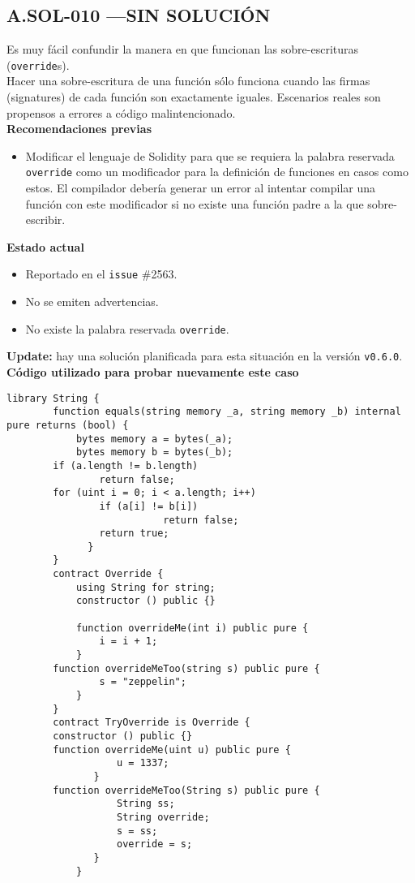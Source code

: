 \subsection*{A.SOL-010  \color{BrickRed}—SIN SOLUCIÓN}
Es muy fácil confundir la manera en que funcionan las sobre-escrituras (\texttt{override}s).\\

Hacer una sobre-escritura de una función sólo funciona cuando las firmas (signatures) de cada función son exactamente iguales. Escenarios reales son propensos a errores a código malintencionado.\\


\textbf{Recomendaciones previas}
\begin{itemize}
    \item Modificar el lenguaje de Solidity para que se requiera la palabra reservada \texttt{override} como un modificador para la definición de funciones en casos como estos. El compilador debería generar un error al intentar compilar una función con este modificador si no existe una función padre a la que sobre-escribir.
\end{itemize}
\bigskip

\textbf{Estado actual}
\begin{itemize}
    \item Reportado en el \texttt{issue} \#2563\cite{GHI2563}.
    \item No se emiten advertencias.
    \item No existe la palabra reservada \texttt{override}.
\end{itemize}

\textbf{Update:} hay una solución planificada para esta situación en la versión \texttt{v0.6.0}.\\

\textbf{Código utilizado para probar nuevamente este caso}
\begin{lstlisting}[language=Solidity]
    library String {
        function equals(string memory _a, string memory _b) internal pure returns (bool) {
            bytes memory a = bytes(_a);
            bytes memory b = bytes(_b);
        if (a.length != b.length)
                return false;
        for (uint i = 0; i < a.length; i++)
                if (a[i] != b[i])
                           return false;
                return true;
              }
        }
        contract Override {
            using String for string;
            constructor () public {}
            
            function overrideMe(int i) public pure {
                i = i + 1;
            }
        function overrideMeToo(string s) public pure {
                s = "zeppelin";
            }
        }
        contract TryOverride is Override {
        constructor () public {}
        function overrideMe(uint u) public pure {
                   u = 1337;
               }
        function overrideMeToo(String s) public pure {
                   String ss;
                   String override;
                   s = ss;
                   override = s;
               }
            }        
\end{lstlisting}

